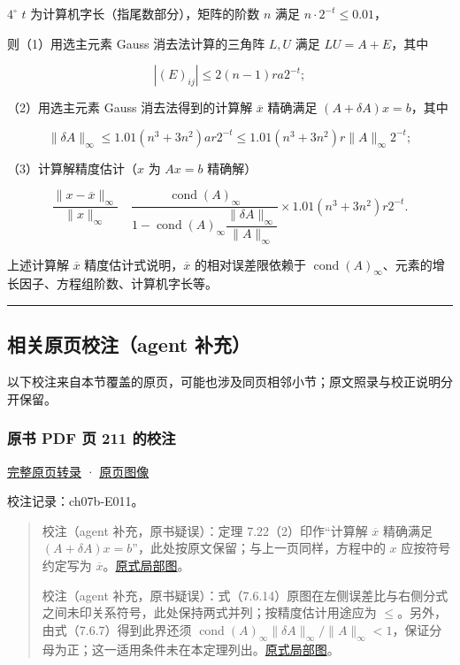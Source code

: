 \documentclass[
  10pt,
  fontset=fandol]{ctexart}
\begin{document}
\(4^\circ\) \(t\) 为计算机字长（指尾数部分），矩阵的阶数 \(n\) 满足 \(n\cdot2^{-t}\leqslant0.01\)，

则（1）用选主元素 Gauss 消去法计算的三角阵 \(L,U\) 满足 \(LU=A+E\)，其中

\[
|(E)_{ij}|\leqslant2(n-1)ra2^{-t};
\]

（2）用选主元素 Gauss 消去法得到的计算解 \(\overline x\) 精确满足 \((A+\delta A)x=b\)，其中

\[
\|\delta A\|_\infty\leqslant1.01(n^3+3n^2)ar2^{-t}\leqslant1.01(n^3+3n^2)r\|A\|_\infty2^{-t};
\]

（3）计算解精度估计（\(x\) 为 \(Ax=b\) 精确解）

\[
\frac{\|x-\overline x\|_\infty}{\|x\|_\infty}
\quad
\frac{\operatorname{cond}(A)_\infty}
{1-\operatorname{cond}(A)_\infty\dfrac{\|\delta A\|_\infty}{\|A\|_\infty}}
\times1.01(n^3+3n^2)r2^{-t}.
\tag{7.6.14}
\]

上述计算解 \(\overline x\) 精度估计式说明，\(\overline x\) 的相对误差限依赖于 \(\operatorname{cond}(A)_\infty\)、元素的增长因子、方程组阶数、计算机字长等。

\begin{center}\rule{0.5\linewidth}{0.5pt}\end{center}

\subsection{相关原页校注（agent 补充）}\label{ux76f8ux5173ux539fux9875ux6821ux6ce8agent-ux8865ux5145}

以下校注来自本节覆盖的原页，可能也涉及同页相邻小节；原文照录与校正说明分开保留。

\subsubsection{原书 PDF 页 211 的校注}\label{ux539fux4e66-pdf-ux9875-211-ux7684ux6821ux6ce8}

\href{../pages/pdf-211.md}{完整原页转录} · \href{../../source-images/pdf-211.jpeg}{原页图像}

校注记录：ch07b-E011。

\begin{quote}
校注（agent 补充，原书疑误）：定理 7.22（2）印作``计算解 \(\overline x\) 精确满足 \((A+\delta A)x=b\)''，此处按原文保留；与上一页同样，方程中的 \(x\) 应按符号约定写为 \(\overline x\)。\href{../assets/ch07b/211-computed-solution.png}{原式局部图}。

校注（agent 补充，原书疑误）：式（7.6.14）原图在左侧误差比与右侧分式之间未印关系符号，此处保持两式并列；按精度估计用途应为 \(\leqslant\)。另外，由式（7.6.7）得到此界还须 \(\operatorname{cond}(A)_\infty\|\delta A\|_\infty/\|A\|_\infty<1\)，保证分母为正；这一适用条件未在本定理列出。\href{../assets/ch07b/211-error-estimate.png}{原式局部图}。
\end{quote}
\end{document}
